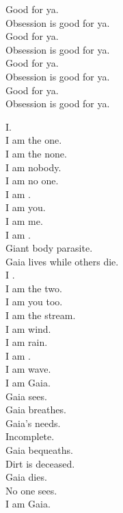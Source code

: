 Good for ya. \\
Obsession is good for ya. \\
Good for ya. \\
Obsession is good for ya. \\
Good for ya. \\
Obsession is good for ya. \\
Good for ya. \\
Obsession is good for ya. \\




I. \\
I am the one. \\
I am the none. \\
I am nobody. \\
I am no one. \\
I am . \\
I am you. \\
I am me. \\
I am . \\

Giant body parasite. \\
Gaia lives while others die. \\

I .\\
I am the two. \\
I am you too. \\
I am the stream. \\
I am wind. \\
I am rain. \\
I am . \\
I am wave. \\
I am Gaia. \\

Gaia sees. \\
Gaia breathes. \\
Gaia's needs. \\
Incomplete. \\
Gaia bequeaths. \\
Dirt is deceased. \\
Gaia dies. \\
No one sees. \\

I am Gaia. \\

